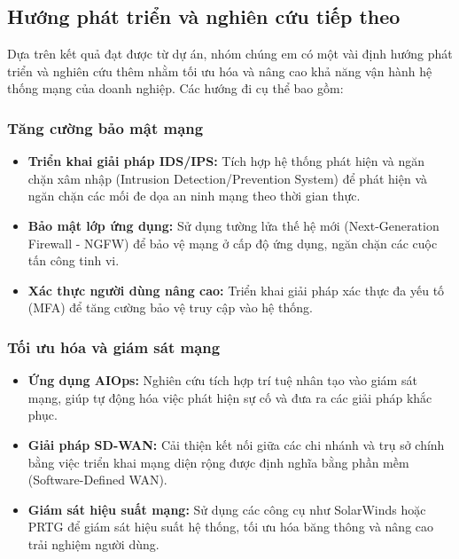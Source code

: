 \documentclass[13pt]{article}
\begin{document}
\subsection{Hướng phát triển và nghiên cứu tiếp theo}
Dựa trên kết quả đạt được từ dự án, nhóm chúng em có một vài định hướng phát triển và nghiên cứu thêm nhằm tối ưu hóa và nâng cao khả năng vận hành hệ thống mạng của doanh nghiệp. Các hướng đi cụ thể bao gồm:
\subsubsection{Tăng cường bảo mật mạng}
\begin{itemize}
    \item \textbf{Triển khai giải pháp IDS/IPS: }Tích hợp hệ thống phát hiện và ngăn chặn xâm nhập (Intrusion Detection/Prevention System) để phát hiện và ngăn chặn các mối đe dọa an ninh mạng theo thời gian thực.
    \item \textbf{Bảo mật lớp ứng dụng: }Sử dụng tường lửa thế hệ mới (Next-Generation Firewall - NGFW) để bảo vệ mạng ở cấp độ ứng dụng, ngăn chặn các cuộc tấn công tinh vi.
    \item \textbf{Xác thực người dùng nâng cao: }Triển khai giải pháp xác thực đa yếu tố (MFA) để tăng cường bảo vệ truy cập vào hệ thống.
\end{itemize}

\subsubsection{Tối ưu hóa và giám sát mạng}
\begin{itemize}
    \item \textbf{Ứng dụng AIOps: }Nghiên cứu tích hợp trí tuệ nhân tạo vào giám sát mạng, giúp tự động hóa việc phát hiện sự cố và đưa ra các giải pháp khắc phục.
    \item \textbf{Giải pháp SD-WAN: }Cải thiện kết nối giữa các chi nhánh và trụ sở chính bằng việc triển khai mạng diện rộng được định nghĩa bằng phần mềm (Software-Defined WAN).
    \item \textbf{Giám sát hiệu suất mạng: }Sử dụng các công cụ như SolarWinds hoặc PRTG để giám sát hiệu suất hệ thống, tối ưu hóa băng thông và nâng cao trải nghiệm người dùng.
\end{itemize}
\end{document}

